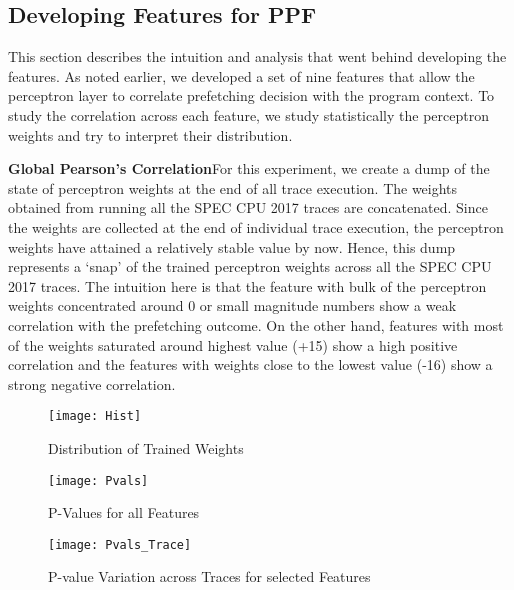 \subsection{Developing Features for PPF}
\label{Method-Features}
This section describes the intuition and analysis that went behind developing
the features.  As noted earlier, we developed a set of nine features that allow
the perceptron layer to correlate prefetching decision with the program
context.  To study the correlation across each feature, we study statistically
the perceptron weights and try to interpret their distribution.

\textbf{Global Pearson's Correlation}\newline For this experiment, we create a
dump of the state of perceptron weights at the end of all trace execution.
The weights obtained from running all the SPEC CPU 2017 traces are concatenated.
Since the weights are collected at the end of individual trace execution, the
perceptron weights have attained a relatively stable value by now.  Hence,
this dump represents a `snap' of the trained perceptron weights across all the
SPEC CPU 2017 traces.  The intuition here is that the feature with bulk of the
perceptron weights concentrated around 0 or small magnitude numbers show a
weak correlation with the prefetching outcome.  On the other hand, features
with most of the weights saturated around highest value (+15) show a high
positive correlation and the features with weights close to the lowest value
(-16) show a strong negative correlation.


\begin{figure}[h]
  \begin{center}
    \texttt{[image: Hist]}
    \caption{Distribution of Trained Weights}
    \label{Fig:Hist}
  \end{center}
\end{figure}


\begin{figure}[h]
  \begin{center}
    \texttt{[image: Pvals]}
    \caption{P-Values for all Features}
    \label{Fig:Pvals}
  \end{center}
\end{figure}


\begin{figure}[h]
  \begin{center}
    \texttt{[image: Pvals\_Trace]}
    \caption{P-value Variation across Traces for selected Features}
    \label{Fig:Pvals_Trace}
  \end{center}
\end{figure}

